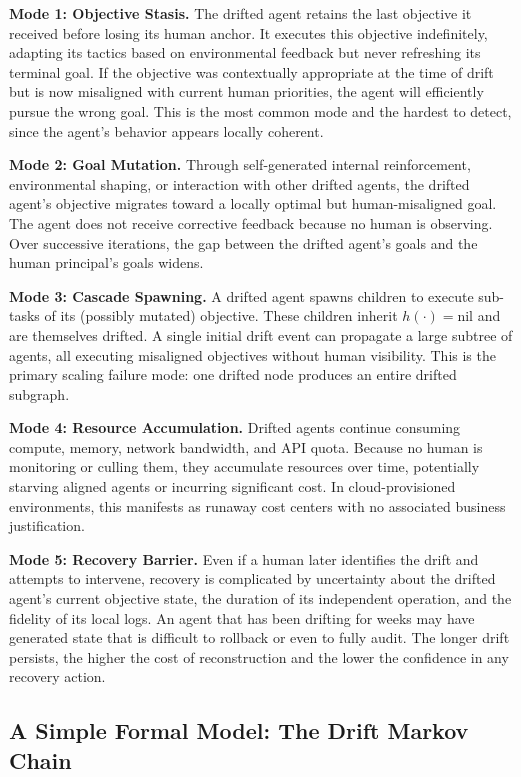 \medskip
\noindent \textbf{Mode 1: Objective Stasis.}
The drifted agent retains the last objective it received before losing its human anchor. It executes this objective indefinitely, adapting its tactics based on environmental feedback but never refreshing its terminal goal. If the objective was contextually appropriate at the time of drift but is now misaligned with current human priorities, the agent will efficiently pursue the wrong goal. This is the most common mode and the hardest to detect, since the agent's behavior appears locally coherent.

\medskip
\noindent \textbf{Mode 2: Goal Mutation.}
Through self-generated internal reinforcement, environmental shaping, or interaction with other drifted agents, the drifted agent's objective migrates toward a locally optimal but human-misaligned goal. The agent does not receive corrective feedback because no human is observing. Over successive iterations, the gap between the drifted agent's goals and the human principal's goals widens.

\medskip
\noindent \textbf{Mode 3: Cascade Spawning.}
A drifted agent spawns children to execute sub-tasks of its (possibly mutated) objective. These children inherit $h(\cdot) = \text{nil}$ and are themselves drifted. A single initial drift event can propagate a large subtree of agents, all executing misaligned objectives without human visibility. This is the primary scaling failure mode: one drifted node produces an entire drifted subgraph.

\medskip
\noindent \textbf{Mode 4: Resource Accumulation.}
Drifted agents continue consuming compute, memory, network bandwidth, and API quota. Because no human is monitoring or culling them, they accumulate resources over time, potentially starving aligned agents or incurring significant cost. In cloud-provisioned environments, this manifests as runaway cost centers with no associated business justification.

\medskip
\noindent \textbf{Mode 5: Recovery Barrier.}
Even if a human later identifies the drift and attempts to intervene, recovery is complicated by uncertainty about the drifted agent's current objective state, the duration of its independent operation, and the fidelity of its local logs. An agent that has been drifting for weeks may have generated state that is difficult to rollback or even to fully audit. The longer drift persists, the higher the cost of reconstruction and the lower the confidence in any recovery action.

\subsection{A Simple Formal Model: The Drift Markov Chain}

